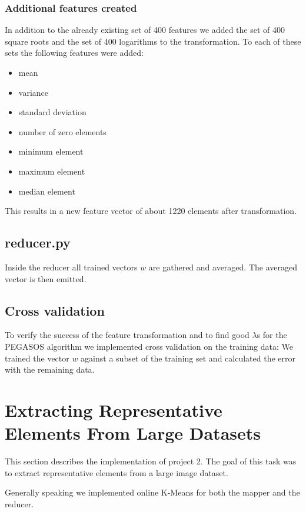 \documentclass[a4paper, 11pt]{article}
\begin{document}
\subsubsection{Additional features created}

In addition to the already existing set of 400 features we added the set of 400
square roots and the set of 400 logarithms to the transformation. To each of
these sets the following features were added:

\begin{itemize}
\item mean
\item variance
\item standard deviation
\item number of zero elements
\item minimum element
\item maximum element
\item median element
\end{itemize}

This results in a new feature vector of about 1220 elements after transformation.

\subsection{reducer.py}

Inside the reducer all trained vectors $w$ are gathered and averaged. The
averaged vector is then emitted.

\subsection{Cross validation}

To verify the success of the feature transformation and to find good $\lambda$s
for the PEGASOS algorithm we implemented cross validation on the training data:
We trained the vector $w$ against a subset of the training set and calculated
the error with the remaining data.

\section{Extracting Representative Elements From Large Datasets}
This section describes the implementation of project 2. The goal of this task was to extract representative elements from a large image dataset.

Generally speaking we implemented online K-Means for both the mapper and the reducer.
\end{document}
